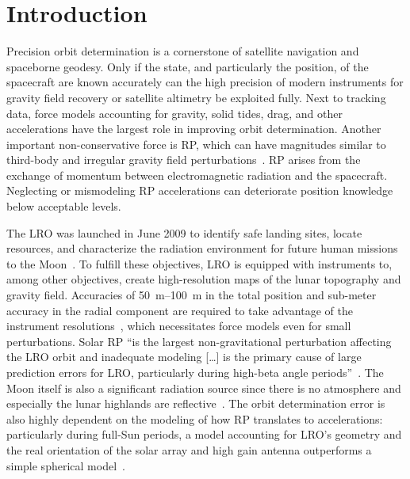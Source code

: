 \section{Introduction}
\label{sec:introduction}

Precision orbit determination is a cornerstone of satellite navigation and spaceborne geodesy. Only if the state, and particularly the position, of the spacecraft are known accurately can the high precision of modern instruments for gravity field recovery or satellite altimetry be exploited fully. Next to tracking data, force models accounting for gravity, solid tides, drag, and other accelerations have the largest role in improving orbit determination. Another important non-conservative force is \acrfull{RP}, which can have magnitudes similar to third-body and irregular gravity field perturbations~\cite{Montenbruck2000}. \gls{RP} arises from the exchange of momentum between electromagnetic radiation and the spacecraft. Neglecting or mismodeling \gls{RP} accelerations can deteriorate position knowledge below acceptable levels.

The \acrfull{LRO} was launched in June 2009 to identify safe landing sites, locate resources, and characterize the radiation environment for future human missions to the Moon~\cite{Tooley2010}. To fulfill these objectives, \gls{LRO} is equipped with instruments to, among other objectives, create high-resolution maps of the lunar topography and gravity field. Accuracies of \qtyrange{50}{100}{\m} in the total position and sub-meter accuracy in the radial component are required to take advantage of the instrument resolutions~\cite{Chin2007,Zuber2009}, which necessitates force models even for small perturbations. Solar \gls{RP} \enquote{is the largest non-gravitational perturbation affecting the LRO orbit and inadequate modeling [\ldots] is the primary cause of large prediction errors for LRO, particularly during high-beta angle periods}~\cite{Slojkowski2015}. The Moon itself is also a significant radiation source since there is no atmosphere and especially the lunar highlands are reflective~\cite{Floberghagen1999}. The orbit determination error is also highly dependent on the modeling of how \gls{RP} translates to accelerations: particularly during full-Sun periods, a model accounting for \gls{LRO}'s geometry and the real orientation of the solar array and high gain antenna outperforms a simple spherical model~\cite{Slojkowski2014}.
 
